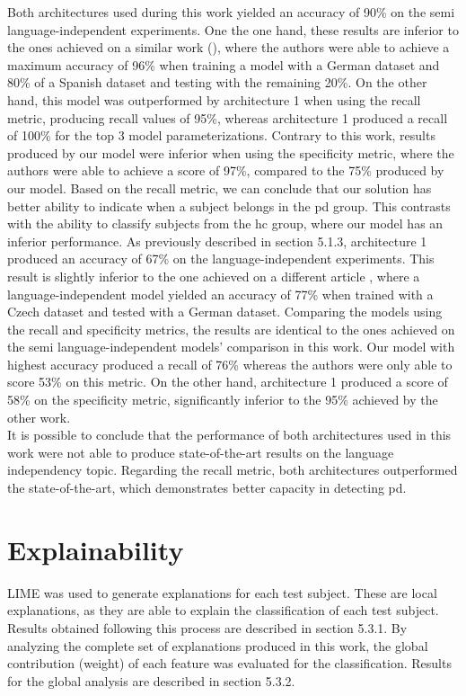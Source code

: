 Both architectures used during this work yielded an accuracy of 90\% on the semi language-independent experiments. One the one hand, these results are inferior to the ones achieved on a similar work (\cite{parkinson_three_languages}), where the authors were able to achieve a maximum accuracy of 96\% when training a model with a German dataset and 80\% of a Spanish dataset and testing with the remaining 20\%. On the other hand, this model was outperformed by architecture 1 when using the recall metric, producing recall values of 95\%, whereas architecture 1 produced a recall of 100\% for the top 3 model parameterizations. Contrary to this work, results produced by our model were inferior when using the specificity metric, where the authors were able to achieve a score of 97\%, compared to the 75\% produced by our model. Based on the recall metric, we can conclude that our solution has better ability to indicate when a subject belongs in the \gls{pd} group. This contrasts with the ability to classify subjects from the \gls{hc} group, where our model has an inferior performance. As previously described in section 5.1.3, architecture 1 produced an accuracy of 67\% on the language-independent experiments. This result is slightly inferior to the one achieved on a different article \cite{parkinson_three_languages}, where a language-independent model yielded an accuracy of 77\% when trained with a Czech dataset and tested with a German dataset. Comparing the models using the recall and specificity metrics, the results are identical to the ones achieved on the semi language-independent models' comparison in this work. Our model with highest accuracy produced a recall of 76\% whereas the authors were only able to score 53\% on this metric. On the other hand, architecture 1 produced a score of 58\% on the specificity metric, significantly inferior to the 95\% achieved by the other work. \\
It is possible to conclude that the performance of both architectures used in this work were not able to produce state-of-the-art results on the language independency topic. Regarding the recall metric, both architectures outperformed the state-of-the-art, which demonstrates better capacity in detecting \gls{pd}.

\section{Explainability}

LIME was used to generate explanations for each test subject. These are local explanations, as they are able to explain the classification of each test subject. Results obtained following this process are described in section 5.3.1. By analyzing the complete set of explanations produced in this work, the global contribution (weight) of each feature was evaluated for the classification. Results for the global analysis are described in section 5.3.2.


